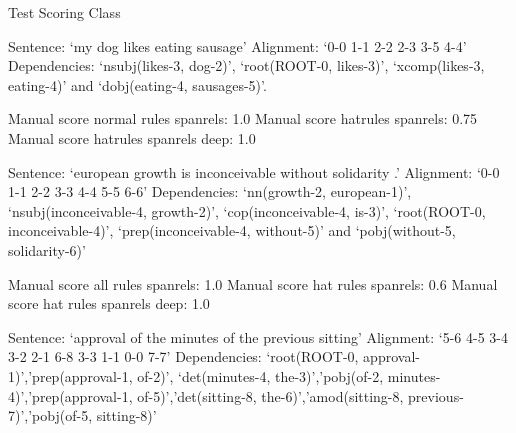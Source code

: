 \documentclass[letterpaper,10pt,english]{sphinxmanual}
\begin{document}
\label{tests:module-tests_scoring}

\begin{fulllineitems}
\label{tests:tests_scoring.ScoreTests}
Test Scoring Class

\begin{fulllineitems}
\label{tests:tests_scoring.ScoreTests.score_test1}
Sentence: `my dog likes eating sausage'
Alignment: `0-0 1-1 2-2 2-3 3-5 4-4'
Dependencies: `nsubj(likes-3, dog-2)', `root(ROOT-0, likes-3)',
`xcomp(likes-3, eating-4)' and `dobj(eating-4, sausages-5)'.

Manual score normal rules spanrels: 1.0
Manual score hatrules spanrels: 0.75
Manual score hatrules spanrels deep: 1.0

\end{fulllineitems}


\begin{fulllineitems}
\label{tests:tests_scoring.ScoreTests.score_test2}
Sentence: `european growth is inconceivable without solidarity .'
Alignment: `0-0 1-1 2-2 3-3 4-4 5-5 6-6'
Dependencies: `nn(growth-2, european-1)', `nsubj(inconceivable-4, growth-2)',
`cop(inconceivable-4, is-3)', `root(ROOT-0, inconceivable-4)', 
`prep(inconceivable-4, without-5)' and `pobj(without-5, solidarity-6)'

Manual score all rules spanrels: 1.0
Manual score hat rules spanrels: 0.6
Manual score hat rules spanrels deep: 1.0

\end{fulllineitems}


\begin{fulllineitems}
\label{tests:tests_scoring.ScoreTests.score_test3}
Sentence: `approval of the minutes of the previous sitting'
Alignment: `5-6 4-5 3-4 3-2 2-1 6-8 3-3 1-1 0-0 7-7'
Dependencies: `root(ROOT-0, approval-1)','prep(approval-1, of-2)', `det(minutes-4, the-3)','pobj(of-2, minutes-4)','prep(approval-1, of-5)','det(sitting-8, the-6)','amod(sitting-8, previous-7)','pobj(of-5, sitting-8)'


\end{fulllineitems}
\end{fulllineitems}
\end{document}

